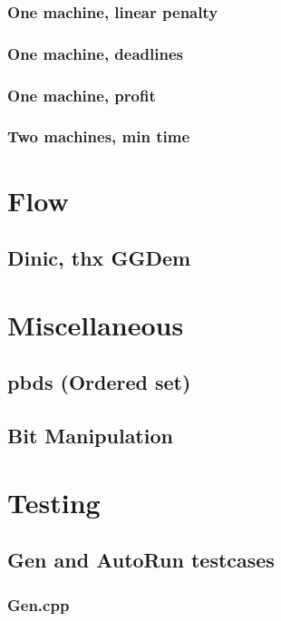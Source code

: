 \subsubsection{One machine, linear penalty}
\subsubsection{One machine, deadlines}
\subsubsection{One machine, profit}
\subsubsection{Two machines, min time}

\section{Flow}
\subsection{Dinic, thx GGDem}

\section{Miscellaneous}
\subsection{pbds (Ordered set)}
\subsection{Bit Manipulation}


\section{Testing}
\subsection{Gen and AutoRun testcases}
\subsubsection{Gen.cpp}
